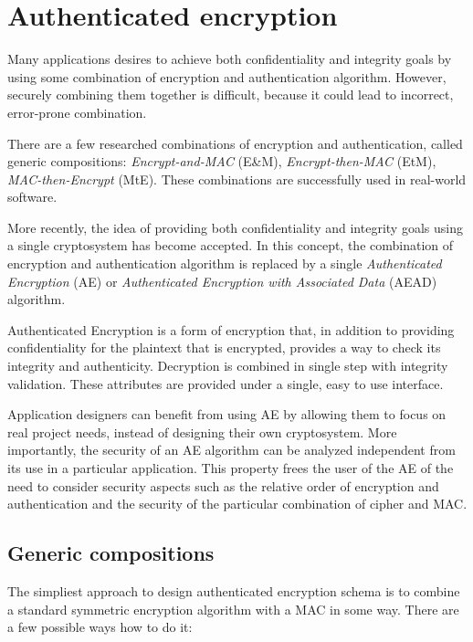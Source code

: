 \section{Authenticated encryption}
\label{toc/authenticated-encryption}

Many applications desires to achieve both confidentiality and integrity goals by using some combination of encryption and authentication algorithm. However, securely combining them together is difficult, because it could lead to incorrect, error-prone combination.

There are a few researched combinations of encryption and authentication, called generic compositions: \textit{Encrypt-and-MAC} (E\&M), \textit{Encrypt-then-MAC} (EtM), \textit{MAC-then-Encrypt} (MtE). These combinations are successfully used in real-world software.

More recently, the idea of providing both confidentiality and integrity goals using a single cryptosystem has become accepted. In this concept, the combination of encryption and authentication algorithm is replaced by a single \textit{Authenticated Encryption} (AE) or \textit{Authenticated Encryption with Associated Data} (AEAD) algorithm.

Authenticated Encryption is a form of encryption that, in addition to providing confidentiality for the plaintext that is encrypted, provides a way to check its integrity and authenticity. Decryption is combined in single step with integrity validation. These attributes are provided under a single, easy to use interface.

Application designers can benefit from using AE by allowing them to focus on real project needs, instead of designing their own cryptosystem. More importantly, the security of an AE algorithm can be analyzed independent from its use in a particular application. This property frees the user of the AE of the need to consider security aspects such as the relative order of encryption and authentication and the security of the particular combination of cipher and MAC.


\subsection{Generic compositions}
\label{toc/generic-compositions}



The simpliest approach to design authenticated encryption schema is to combine a standard symmetric encryption algorithm with a MAC in some way. There are a few possible ways how to do it:

